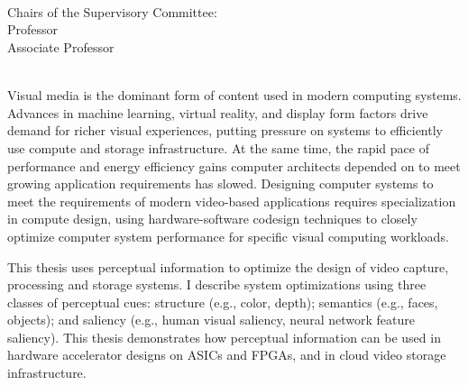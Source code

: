 \begingroup
\let\clearpage\relax
\let\cleardoublepage\relax
\let\cleardoublepage\relax

\thispagestyle{empty}
\begin{center}
     \\
    \bigskip
    {\color{CTtitle}\spacedallcaps{\myTitle} \\ \bigskip
    }
    \bigskip
    \myName \\
    \bigskip
    Chairs of the Supervisory Committee: \\
    Professor \myChair \\
    Associate Professor \myOtherChair \\
    \myDepartment \\
    \bigskip
\end{center}


Visual media is the dominant form of content used in modern computing systems.
Advances in machine learning, virtual reality, and display form factors drive demand for richer visual experiences, putting pressure on systems to efficiently use compute and storage infrastructure.
At the same time, the rapid pace of performance and energy efficiency gains computer architects depended on to meet growing application requirements has slowed.
Designing computer systems to meet the requirements of modern video-based applications requires specialization in compute design, using hardware-software codesign techniques to closely optimize computer system performance for specific visual computing workloads.

This thesis uses perceptual information to optimize the design of video capture, processing and storage systems.
I describe system optimizations using three classes of perceptual cues: structure (e.g., color, depth); semantics (e.g., faces, objects); and saliency (e.g., human visual saliency, neural network feature saliency).
This thesis demonstrates how perceptual information can be used in hardware accelerator designs on ASICs and FPGAs, and in cloud video storage infrastructure.

\endgroup

\vfill

